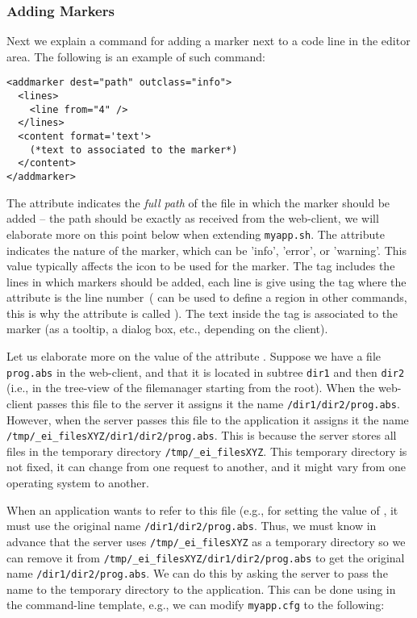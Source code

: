 \subsubsection{Adding Markers}

Next we explain a command for adding a marker next to a code line in
the editor area. The following is an example of such command:

\medskip
\begin{lstlisting}
<addmarker dest="path" outclass="info">
  <lines>
    <line from="4" />
  </lines>
  <content format='text'>
    (*text to associated to the marker*)
  </content>
</addmarker>
\end{lstlisting}

\medskip
\noindent
The attribute  indicates the \emph{full path} of the file in
which the marker should be added -- the path should be exactly as
received from the web-client, we will elaborate more on this point
below when extending \texttt{myapp.sh}.
%
The attribute  indicates the nature of the marker, which
can be 'info', 'error', or 'warning'. This value typically affects the
icon to be used for the marker.
%
The tag  includes the lines in which markers should be
added, each line is give using the tag  where the 
attribute is the line number~( can be used to define a
region in other commands, this is why the attribute is called
).
%
The text inside the  tag is associated to the marker (as
a tooltip, a dialog box, etc., depending on the client).

Let us elaborate more on the value of the attribute
. Suppose we have a file \texttt{prog.abs} in the
web-client, and that it is located in subtree \texttt{dir1} and then
\texttt{dir2} (i.e., in the tree-view of the filemanager starting from
the root).
%
When the web-client passes this file to the server it assigns it the
name \texttt{/dir1/dir2/prog.abs}. However, when the server passes
this file to the application it assigns it the name
\texttt{/tmp/\_ei\_filesXYZ/dir1/dir2/prog.abs}. 
%
This is because the server stores all files in the temporary directory
\texttt{/tmp/\_ei\_filesXYZ}. This temporary directory is not fixed, it
can change from one request to another, and it might vary from one
operating system to another.

When an application wants to refer to this file (e.g., for setting the
value of , it must use the original name
\texttt{/dir1/dir2/prog.abs}.
%
Thus, we must know in advance that the server uses
\texttt{/tmp/\_ei\_filesXYZ} as a temporary directory so we can remove
it from \texttt{/tmp/\_ei\_filesXYZ/dir1/dir2/prog.abs} to get the
original name \texttt{/dir1/dir2/prog.abs}. 
%
We can do this by asking the server to pass the name to the temporary
directory to the application. This can be done using  in
the command-line template, e.g., we can modify \texttt{myapp.cfg} to
the following:


